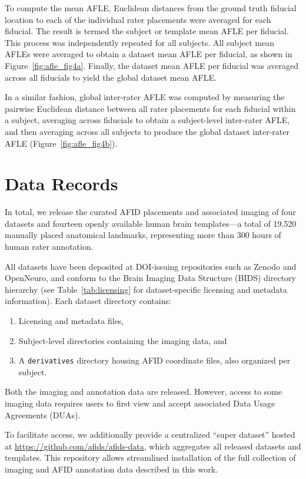 To compute the mean AFLE, Euclidean distances from the ground truth fiducial location to each of the individual rater placements were averaged for each fiducial. The result is termed the subject or template mean AFLE per fiducial. This process was independently repeated for all subjects. All subject mean AFLEs were averaged to obtain a dataset mean AFLE per fiducial, as shown in Figure~\ref{fig:afle_fig4a}. Finally, the dataset mean AFLE per fiducial was averaged across all fiducials to yield the global dataset mean AFLE. 

In a similar fashion, global inter-rater AFLE was computed by measuring the pairwise Euclidean distance between all rater placements for each fiducial within a subject, averaging across fiducials to obtain a subject-level inter-rater AFLE, and then averaging across all subjects to produce the global dataset inter-rater AFLE (Figure~\ref{fig:afle_fig4b}).

\section{Data Records}
In total, we release the curated AFID placements and associated imaging of four datasets and fourteen openly available human brain templates—a total of 19,520 manually placed anatomical landmarks, representing more than 300 hours of human rater annotation.

All datasets have been deposited at DOI-issuing repositories such as Zenodo and OpenNeuro\cite{zenodo,openneuro1,openneuro2,openneuro3}, and conform to the Brain Imaging Data Structure (BIDS) directory hierarchy (see Table~\ref{tab:licensing} for dataset-specific licensing and metadata information). Each dataset directory contains: 
\begin{enumerate}
    \item Licensing and metadata files,
    \item Subject-level directories containing the imaging data, and
    \item A \texttt{derivatives} directory housing AFID coordinate files, also organized per subject.
\end{enumerate}
Both the imaging and annotation data are released. However, access to some imaging data requires users to first view and accept associated Data Usage Agreements (DUAs).

To facilitate access, we additionally provide a centralized “super dataset” hosted at \url{https://github.com/afids/afids-data}\cite{afidsdata}, which aggregates all released datasets and templates. This repository allows streamlined installation of the full collection of imaging and AFID annotation data described in this work.

